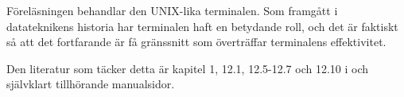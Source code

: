 Föreläsningen behandlar den UNIX-lika terminalen.
Som framgått i datateknikens historia har terminalen haft en betydande roll, 
och det är faktiskt så att det fortfarande är få gränssnitt som överträffar 
terminalens effektivitet.

Den literatur som täcker detta är kapitel 1, 12.1, 12.5-12.7 och 12.10 
i  \cite{nemeth2011ual} och självklart tillhörande 
manualsidor.
